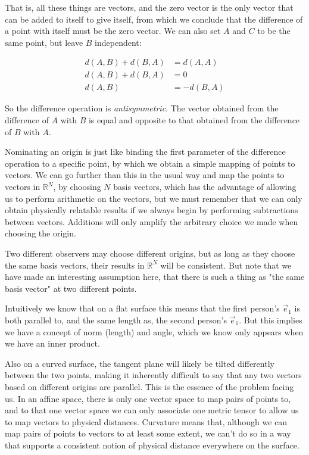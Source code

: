 That is, all these things are vectors, and the zero vector is the only vector that can be added to itself to give itself, from which we conclude that the difference of a point with itself must be the zero vector. We can also set $A$ and $C$ to be the same point, but leave $B$ independent:

\begin{equation}
    \begin{split}
    d(A, B) + d(B, A) &= d(A, A) \\
    d(A, B) + d(B, A) &= 0 \\
    d(A, B) &= -d(B, A)
    \end{split}
\end{equation}

So the difference operation is \textit{antisymmetric}. The vector obtained from the difference of $A$ with $B$ is equal and opposite to that obtained from the difference of $B$ with $A$.

Nominating an origin is just like binding the first parameter of the difference operation to a specific point, by which we obtain a simple mapping of points to vectors. We can go further than this in the usual way and map the points to vectors in $\mathbb{R}^N$, by choosing $N$ basis vectors, which has the advantage of allowing us to perform arithmetic on the vectors, but we must remember that we can only obtain physically relatable results if we always begin by performing subtractions between vectors. Additions will only amplify the arbitrary choice we made when choosing the origin.

Two different observers may choose different origins, but as long as they choose the same basis vectors, their results in $\mathbb{R}^N$ will be consistent. But note that we have made an interesting assumption here, that there is such a thing as "the same basis vector" at two different points.

Intuitively we know that on a flat surface this means that the first person's $\vec{e}_1$ is both parallel to, and the same length as, the second person's $\vec{e}_1$. But this implies we have a concept of norm (length) and angle, which we know only appears when we have an inner product.

Also on a curved surface, the tangent plane will likely be tilted differently between the two points, making it inherently difficult to say that any two vectors based on different origins are parallel. This is the essence of the problem facing us. In an affine space, there is only one vector space to map pairs of points to, and to that one vector space we can only associate one metric tensor to allow us to map vectors to physical distances. Curvature means that, although we can map pairs of points to vectors to at least some extent, we can't do so in a way that supports a consistent notion of physical distance everywhere on the surface.

